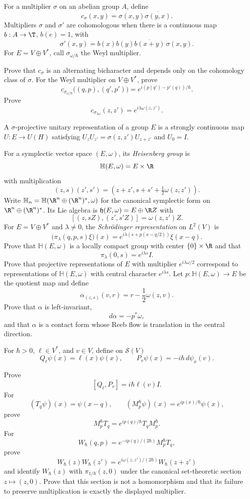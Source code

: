\begin{exercise}
For a multiplier $\sigma$ on an abelian group $A$, define
\[
c_\sigma(x,y)=\sigma(x,y)\overline{\sigma(y,x)}.
\]
Multipliers $\sigma$ and $\sigma'$ are cohomologous when there is a
continuous map $b:A\to\T$, $b(e)=1$, with
\[
\sigma'(x,y)=b(x)b(y)\overline{b(x+y)}\,\sigma(x,y).
\]
For $E=V\oplus V^*$, call $\sigma_{\omega/\hbar}$ the Weyl multiplier.

Prove that $c_\sigma$ is an alternating bicharacter and depends only on the
cohomology class of $\sigma$.  For the Weyl multiplier on $V\oplus V^*$,
prove
\[
c_{\sigma_{\omega/\hbar}}\bigl((q,p),(q',p')\bigr)
=e^{i(p(q')-p'(q))/\hbar}.
\]
Prove
\[
c_{\sigma_{\lambda\omega}}(z,z')=e^{i\lambda\omega(z,z')}.
\]
\end{exercise}


\begin{exercise}
A $\sigma$-projective unitary representation of a group $E$ is a strongly
continuous map $U:E\to U(H)$ satisfying
$U_zU_{z'}=\sigma(z,z')U_{z+z'}$ and $U_0=I$.

For a symplectic vector space $(E,\omega)$, its \emph{Heisenberg group} is
\[
\mathbb H(E,\omega)=E\times\R
\]
with multiplication
\[
(z,s)(z',s')
=(z+z',s+s'+\tfrac12\omega(z,z')).
\]
Write
$\mathbb H_n=\mathbb H(\R^n\oplus(\R^n)^*,\omega)$ for the canonical
symplectic form on $\R^n\oplus(\R^n)^*$.  Its Lie algebra is
$\mathfrak h(E,\omega)=E\oplus\R Z$ with
\[
[(z,sZ),(z',s'Z)]=\omega(z,z')Z.
\]
For $E=V\oplus V^*$ and $\lambda\ne0$, the \emph{Schr\"odinger
representation} on $L^2(V)$ is
\[
\bigl(\pi_\lambda(q,p,s)\xi\bigr)(x)
=e^{i\lambda(s+p(x-q/2))}\xi(x-q).
\]
Prove that $\mathbb H(E,\omega)$ is a locally compact group with center
$\{0\}\times\R$ and that
\[
\pi_\lambda(0,s)=e^{i\lambda s}I.
\]
Prove that projective representations of $E$ with multiplier
$e^{i\lambda\omega/2}$ correspond to representations of
$\mathbb H(E,\omega)$ with central character $e^{i\lambda s}$.
Let $p:\mathbb H(E,\omega)\to E$ be the quotient map and define
\[
\alpha_{(z,s)}(v,r)=r-\frac12\omega(z,v).
\]
Prove that $\alpha$ is left-invariant,
\[
d\alpha=-p^*\omega,
\]
and that $\alpha$ is a contact form whose Reeb flow is translation in the
central direction.
\end{exercise}

\begin{exercise}
For $\hbar>0$, $\ell\in V^*$, and $v\in V$, define on $\mathcal S(V)$
\[
Q_\ell\psi(x)=\ell(x)\psi(x),
\qquad
P_v\psi(x)=-i\hbar\,d\psi_x(v).
\]

Prove
\[
[Q_\ell,P_v]=i\hbar\ell(v)I.
\]
For
\[
(T_q\psi)(x)=\psi(x-q),
\qquad
(M_p^\hbar\psi)(x)=e^{ip(x)/\hbar}\psi(x),
\]
prove
\[
M_p^\hbar T_q=e^{ip(q)/\hbar}T_qM_p^\hbar.
\]
For
\[
W_\hbar(q,p)=e^{-ip(q)/(2\hbar)}M_p^\hbar T_q,
\]
prove
\[
W_\hbar(z)W_\hbar(z')
=e^{i\omega(z,z')/(2\hbar)}W_\hbar(z+z')
\]
and identify $W_\hbar(z)$ with
$\pi_{1/\hbar}(z,0)$ under the canonical set-theoretic section
$z\mapsto(z,0)$.  Prove that this section is not a homomorphism and that
its failure to preserve multiplication is exactly the displayed multiplier.
\end{exercise}


